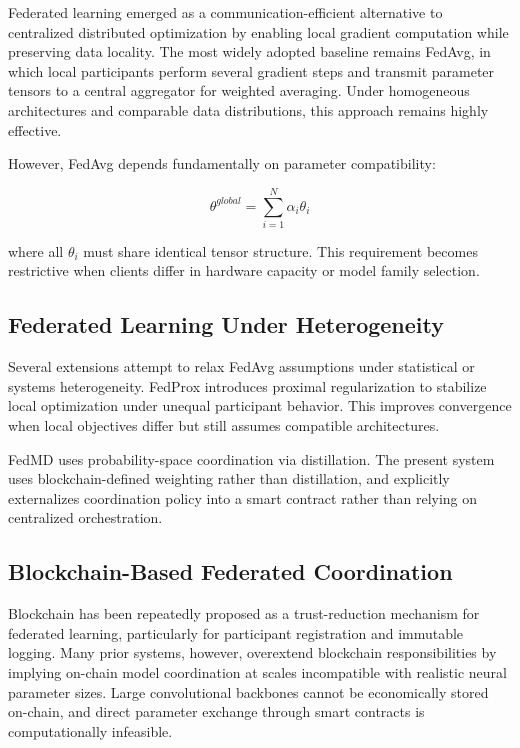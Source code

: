 \documentclass[conference]{IEEEtran}
\begin{document}
Federated learning emerged as a communication-efficient alternative to centralized distributed optimization by enabling local gradient computation while preserving data locality. The most widely adopted baseline remains FedAvg, in which local participants perform several gradient steps and transmit parameter tensors to a central aggregator for weighted averaging. Under homogeneous architectures and comparable data distributions, this approach remains highly effective.

However, FedAvg depends fundamentally on parameter compatibility:

\begin{equation}
\theta^{global} = \sum_{i=1}^{N} \alpha_i \theta_i
\end{equation}

where all $\theta_i$ must share identical tensor structure. This requirement becomes restrictive when clients differ in hardware capacity or model family selection.

\subsection{Federated Learning Under Heterogeneity}

Several extensions attempt to relax FedAvg assumptions under statistical or systems heterogeneity. FedProx introduces proximal regularization to stabilize local optimization under unequal participant behavior. This improves convergence when local objectives differ but still assumes compatible architectures.

FedMD uses probability-space coordination via distillation. The present system uses blockchain-defined weighting rather than distillation, and explicitly externalizes coordination policy into a smart contract rather than relying on centralized orchestration.

\subsection{Blockchain-Based Federated Coordination}

Blockchain has been repeatedly proposed as a trust-reduction mechanism for federated learning, particularly for participant registration and immutable logging. Many prior systems, however, overextend blockchain responsibilities by implying on-chain model coordination at scales incompatible with realistic neural parameter sizes. Large convolutional backbones cannot be economically stored on-chain, and direct parameter exchange through smart contracts is computationally infeasible.
\end{document}
